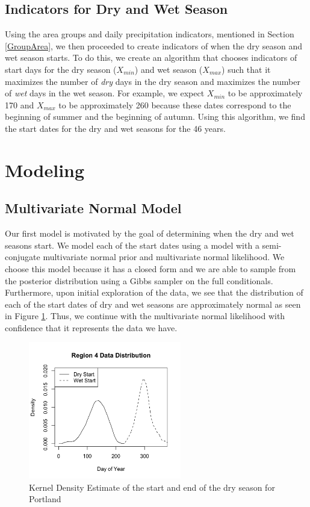 \documentclass{article}
\begin{document}
\subsection{Indicators for Dry and Wet Season}
Using the area groups and daily precipitation indicators, mentioned in Section \ref{GroupArea}, we then proceeded to create indicators of when the dry season and wet season starts. To do this, we create an algorithm that chooses indicators of start days for  the dry season ($X_{min}$) and wet season ($X_{max}$) such that it maximizes the number of \textit{dry} days in the dry season and maximizes the number of \textit{wet} days in the wet season. For example, we expect $X_{min}$ to be approximately 170 and $X_{max}$ to be approximately 260 because these dates correspond to the beginning of summer and the beginning of autumn. Using this algorithm, we find the start dates for the dry and wet seasons for the 46 years.


\section{Modeling}
\subsection{Multivariate Normal Model}
Our first model is motivated by the goal of determining when the dry and wet seasons start. We model each of the start dates using a model with a semi-conjugate multivariate normal prior and multivariate normal likelihood. We choose this model because it has a closed form and we are able to sample from the posterior distribution using a Gibbs sampler on the full conditionals. Furthermore, upon initial exploration of the data, we see that the distribution of each of the start dates of dry and wet seasons are approximately normal as seen in Figure \ref{PDXexample}. Thus, we continue with the multivariate normal likelihood with confidence that it represents the data we have. 

\begin{figure}[H]
\includegraphics[width = .4\textwidth, height = 6cm]{Area4DataDistribution}
\caption{Kernel Density Estimate of the start and end of the dry season for Portland}
\label{PDXexample}
\end{figure}
\end{document}
